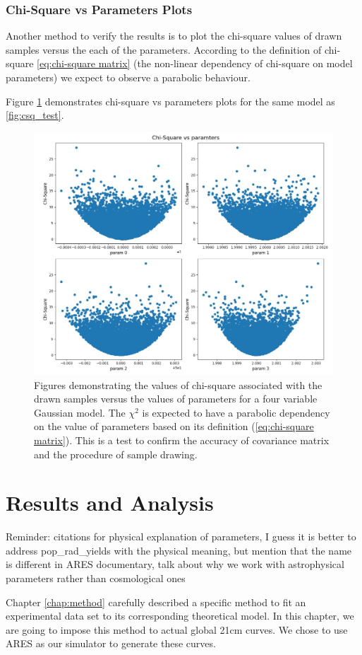 \documentclass[12pt, TexShade, letterpaper]{report}
\begin{document}
\subsection{Chi-Square vs Parameters Plots}
\label{chap:method,sub:test,subsub:plot}
Another method to verify the results is to plot the chi-square values of drawn samples versus the each of the parameters. According to the definition of chi-square \ref{eq:chi-square matrix} (the non-linear dependency of chi-square on model parameters) we expect to observe a parabolic behaviour.\par
Figure \ref{fig:csq_params} demonstrates chi-square vs parameters plots for the same model as \ref{fig:csq_test}.
\begin{figure}[h!]
\centering
\includegraphics[scale =0.9]{csq_params.jpg}
\caption[Chi-Square vs parameters plots]{Figures demonstrating the values of chi-square associated with the drawn samples versus the values of parameters for a four variable Gaussian model. The $\chi^2$ is expected to have a parabolic dependency on the value of parameters based on its definition (\ref{eq:chi-square matrix}). This is a test to confirm the accuracy of covariance matrix and the procedure of sample drawing.}
\label{fig:csq_params}
\end{figure}
\chapter{Results and Analysis}
\label{chap:results}
Reminder: citations for physical explanation of parameters, I guess it is better to address pop\_rad\_yields with the physical meaning, but mention that the name is different in ARES documentary, talk about why we work with astrophysical parameters rather than cosmological ones\par
Chapter \ref{chap:method} carefully described a specific method to fit an experimental data set to its corresponding theoretical model. In this chapter, we are going to impose this method to actual global 21cm curves. We chose to use ARES as our simulator to generate these curves. \par
\end{document}
